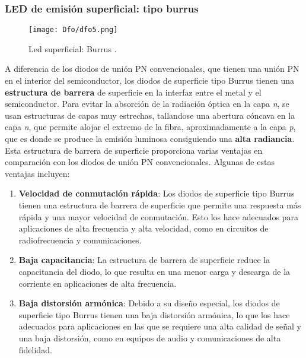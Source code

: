 \documentclass[
	12pt, %
	fleqn, %
	a4paper, %
	oneside, %
]{LegrandOrangeBook}
\begin{document}
\subsubsection*{LED de emisión superficial: tipo burrus}
\begin{figure}[H]
\centering
\texttt{[image: Dfo/dfo5.png]}
\caption{Led superficial: Burrus .}
\end{figure}
A diferencia de los diodos de unión PN convencionales, que tienen una unión PN en el interior del semiconductor, los diodos de superficie tipo Burrus tienen una \textbf{estructura de barrera} de superficie en la interfaz entre el metal y el semiconductor. Para evitar la absorción de la radiación óptica en la capa \textit{n}, se usan estructuras de capas muy estrechas, tallandose una abertura cóncava en la capa \textit{n}, que permite alojar el extremo de la fibra, aproximadamente a la capa \textit{p}, que es donde se produce la emisión luminosa consiguiendo una \textbf{alta radiancia}.\\
Esta estructura de barrera de superficie proporciona varias ventajas en comparación con los diodos de unión PN convencionales. Algunas de estas ventajas incluyen:
\begin{enumerate}
\item \textbf{Velocidad de conmutación rápida}: Los diodos de superficie tipo Burrus tienen una estructura de barrera de superficie que permite una respuesta más rápida y una mayor velocidad de conmutación. Esto los hace adecuados para aplicaciones de alta frecuencia y alta velocidad, como en circuitos de radiofrecuencia y comunicaciones.
\item \textbf{Baja capacitancia}: La estructura de barrera de superficie reduce la capacitancia del diodo, lo que resulta en una menor carga y descarga de la corriente en aplicaciones de alta frecuencia.
\item \textbf{Baja distorsión armónica}: Debido a su diseño especial, los diodos de superficie tipo Burrus tienen una baja distorsión armónica, lo que los hace adecuados para aplicaciones en las que se requiere una alta calidad de señal y una baja distorsión, como en equipos de audio y comunicaciones de alta fidelidad.
\end{enumerate}
\end{document}
